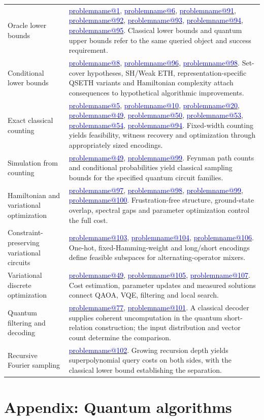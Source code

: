 \documentclass[11pt,a4paper]{article}
\makeatletter
\theoremstyle{problemstyle}
\newcommand{\problemref}[1]{\hyperref[entry:#1]{\textcolor{blue}{\csname problemname@#1\endcsname}}}
\makeatother
\begin{document}
\begin{longtable}{@{}>{\raggedright\arraybackslash}p{}>{\raggedright\arraybackslash}p{}@{}}
Oracle lower bounds & \problemref{1}, \problemref{6}, \problemref{91}, \problemref{92}, \problemref{93}, \problemref{94}, \problemref{95}. Classical lower bounds and quantum upper bounds refer to the same queried object and success requirement. \\[5pt]
Conditional lower bounds & \problemref{8}, \problemref{96}, \problemref{98}. Set-cover hypotheses, SH/Weak ETH, representation-specific QSETH variants and Hamiltonian complexity attach consequences to hypothetical algorithmic improvements. \\[5pt]
Exact classical counting & \problemref{5}, \problemref{10}, \problemref{20}, \problemref{49}, \problemref{50}, \problemref{53}, \problemref{54}, \problemref{94}. Fixed-width counting yields feasibility, witness recovery and optimization through appropriately sized encodings. \\[5pt]
Simulation from counting & \problemref{49}, \problemref{99}. Feynman path counts and conditional probabilities yield classical sampling bounds for the specified quantum circuit families. \\[5pt]
Hamiltonian and variational optimization & \problemref{97}, \problemref{98}, \problemref{99}, \problemref{100}. Frustration-free structure, ground-state overlap, spectral gaps and parameter optimization control the full cost. \\[5pt]
Constraint-preserving variational circuits & \problemref{103}, \problemref{104}, \problemref{106}. One-hot, fixed-Hamming-weight and long/short encodings define feasible subspaces for alternating-operator mixers. \\[5pt]
Variational discrete optimization & \problemref{49}, \problemref{105}, \problemref{107}. Cost estimation, parameter updates and measured solutions connect QAOA, VQE, filtering and local search. \\[5pt]
Quantum filtering and decoding & \problemref{77}, \problemref{101}. A classical decoder supplies coherent uncomputation in the quantum short-relation construction; the input distribution and vector count determine the comparison. \\[5pt]
Recursive Fourier sampling & \problemref{102}. Growing recursion depth yields superpolynomial query costs on both sides, with the classical lower bound establishing the separation. \\[5pt]
\bottomrule
\end{longtable}
\endgroup


\clearpage

\section*{Appendix: Quantum algorithms}
\end{document}
